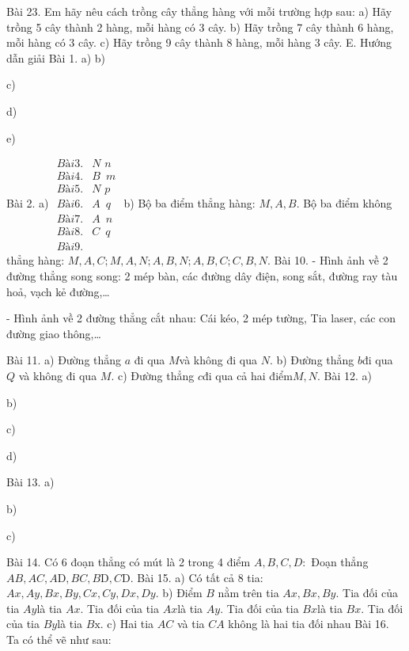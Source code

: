 Bài 23. Em hãy nêu cách trồng cây thẳng hàng với mỗi trường hợp sau: 
a) Hãy trồng 5 cây thành 2 hàng, mỗi hàng có 3 cây.
b) Hãy trồng 7 cây thành 6 hàng, mỗi hàng có 3 cây.
c) Hãy trồng 9 cây thành 8 hàng, mỗi hàng 3 cây.
E. Hướng dẫn giải
Bài 1. 
a)
b) 

c) 

d) 

e) 


Bài 2. a)
$\begin{align}
	Bài 3.   & N\,\,n \\ 
	Bài 4.  & B\,\,\,m \\ 
	Bài 5.  & N\,\,p \\ 
	Bài 6.  & A\,\,\,q \\ 
	Bài 7.  & A\,\,\,n \\ 
	Bài 8.  & C\,\,\,q \\ 
	Bài 9. \end{align}$
b) Bộ ba điểm thẳng hàng: $M,A,B$.
Bộ ba điểm không thẳng hàng: $M,A,C;M,A,N;A,B,N;A,B,C;C,B,N.$
Bài 10. 
- Hình ảnh về 2 đường thẳng song song: 2 mép bàn, các đường dây điện, song sắt, đường ray tàu hoả, vạch kẻ đường,…

- Hình ảnh về 2 đường thẳng cắt nhau: Cái kéo, 2 mép tường, Tia laser, các con đường giao thông,…

Bài 11. 
a) Đường thẳng $a$ đi qua $M$và không đi qua $N.$
b) Đường thẳng $b$đi qua $Q$ và không đi qua $M.$
c) Đường thẳng $c$đi qua cả hai điểm$M,N.$
Bài 12. 
a) 

b) 

c) 

d) 

Bài 13. 
a) 

b)                

c)

Bài 14. Có 6 đoạn thẳng có mút là 2 trong 4 điểm $A,B,C,D:$
Đoạn thẳng $AB,AC,A\text{D},BC,B\text{D},C\text{D}.$
Bài 15. 
a) Có tất cả 8 tia: $Ax,Ay,Bx,By,Cx,Cy,Dx,Dy.$
b) Điểm $B$ nằm trên tia $Ax,Bx,By.$
Tia đối của tia $Ay$là tia $Ax$.
Tia đối của tia $Ax$là tia $Ay$.
Tia đối của tia $Bx$là tia $Bx$.
Tia đối của tia $By$là tia $B\text{x}$.
c) Hai tia $AC$ và tia $CA$ không là hai tia đối nhau
Bài 16. Ta có thể vẽ như sau: 

